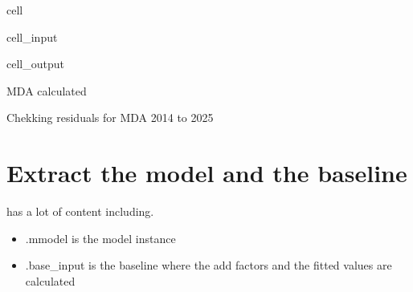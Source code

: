 \documentclass[letterpaper,10pt,english]{jupyterBook}
\begin{document}
\begin{sphinxuseclass}{cell}\begin{sphinxVerbatimInput}

\begin{sphinxuseclass}{cell_input}
\begin{sphinxVerbatim}[commandchars=\\\{\}]
   
\end{sphinxVerbatim}

\end{sphinxuseclass}\end{sphinxVerbatimInput}
\begin{sphinxVerbatimOutput}

\begin{sphinxuseclass}{cell_output}
\begin{sphinxVerbatim}[commandchars=\\\{\}]
MDA calculated  

Chekking residuals for MDA 2014 to 2025
\end{sphinxVerbatim}

\end{sphinxuseclass}\end{sphinxVerbatimOutput}

\end{sphinxuseclass}

\section{Extract the model and the baseline}
\label{\detokenize{content/howto/onboard/eviews/onboard one model from  wf1:extract-the-model-and-the-baseline}}
\sphinxAtStartPar
{} has a lot of content including.
\begin{itemize}
\item {} 
\sphinxAtStartPar
.mmodel is the model instance

\item {} 
\sphinxAtStartPar
.base\_input is the baseline where the add factors and the fitted values are calculated

\end{itemize}
\end{document}
